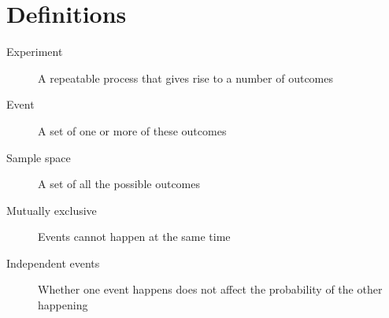 \section{Definitions}
\begin{description}
	\item[Experiment] A repeatable process that gives rise to a number of outcomes
	\item[Event] A set of one or more of these outcomes
	\item[Sample space] A set of all the possible outcomes
	\item[Mutually exclusive] Events cannot happen at the same time
	\item[Independent events] Whether one event happens does not affect the probability of the other happening
\end{description}


